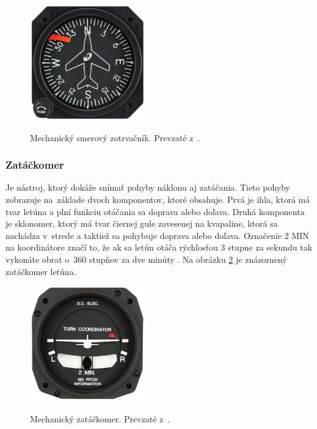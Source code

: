 \begin{figure}[ht]
\centering
\includegraphics[height=5cm, width=5cm]{obrazky-figures/smerovyzotrvacnik.png}
\caption{Mechanický smerový zotrvačník. Prevzaté z~\cite{fotoIndikator}.}{\label{heading}}
\end{figure}

\bigskip
\subsubsection{Zatáčkomer}
Je nástroj, ktorý dokáže snímať pohyby náklonu aj zatáčania. Tieto pohyby zobrazuje na~základe dvoch komponentov, ktoré obsahuje. Prvá je ihla, ktorá má tvar letúna a plní funkciu otáčania sa doprava alebo doľava. Druhá komponenta je sklonomer, ktorý má tvar čiernej gule zavesenej na kvapaline, ktorá sa nachádza v~strede a taktiež sa pohybuje doprava alebo doľava. Označenie 2 MIN na koordinátore značí to, že ak sa letún otáča rýchlosťou 3 stupne za sekundu tak vykonáte obrat o~360 stupňov za dve minúty \cite{turn}. Na obrázku \ref{turning} je znázornený zatáčkomer letúna.

\begin{figure}[ht]
\centering
\includegraphics[height=5cm, width=5cm]{obrazky-figures/zatackomer.png}
\caption{Mechanický zatáčkomer. Prevzaté z~\cite{fotoIndikator}.}{\label{turning}}
\end{figure}


